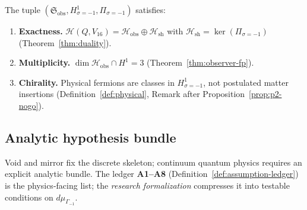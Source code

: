 \begin{theorem}
\label{thm:formal-observer}
The tuple $(\mathfrak{S}_{\mathrm{obs}},H^1_{\sigma=-1},\Pi_{\sigma=-1})$
satisfies:
\begin{enumerate}[label=(\roman*),leftmargin=*]
  \item \textbf{Exactness.} $\mathcal{H}(Q,V_{16})=\mathcal{H}_{\mathrm{obs}}
    \oplus\mathcal{H}_{\mathrm{sh}}$ with
    $\mathcal{H}_{\mathrm{sh}}=\ker(\Pi_{\sigma=-1})$ (Theorem~\ref{thm:duality}).
  \item \textbf{Multiplicity.} $\dim\mathcal{H}_{\mathrm{obs}}\cap H^1=3$
    (Theorem~\ref{thm:observer-fp}).
  \item \textbf{Chirality.} Physical fermions are classes in
    $H^1_{\sigma=-1}$, not postulated matter insertions
    (Definition~\ref{def:physical}, Remark after Proposition~\ref{prop:p2-nogo}).
\end{enumerate}
\end{theorem}

\subsection{Analytic hypothesis bundle}
\label{sec:formal-foundations:hypotheses}

Void and mirror fix the discrete skeleton; continuum quantum physics requires
an explicit analytic bundle. The ledger \textbf{A1--A8}
(Definition~\ref{def:assumption-ledger}) is the physics-facing list; the
\emph{research formalization} compresses it into testable conditions on
$d\mu_{\Gamma_{-1}}$.

